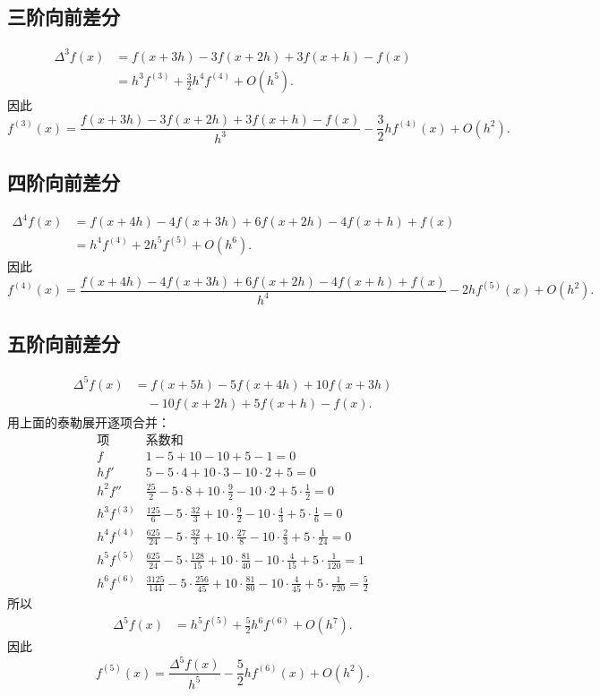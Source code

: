 \documentclass[12pt,a4paper]{ctexart}
\begin{document}
\subsection{三阶向前差分}
\[
\begin{aligned}
\Delta^3 f(x)
&=f(x+3h)-3f(x+2h)+3f(x+h)-f(x)\\
&=h^3f^{(3)}+\frac32h^4f^{(4)}+O(h^5).
\end{aligned}
\]
因此
\[
  \boxed{f^{(3)}(x)=\frac{f(x+3h)-3f(x+2h)+3f(x+h)-f(x)}{h^3}-\frac32h f^{(4)}(x)+O(h^2).}
\]

\subsection{四阶向前差分}
\[
\begin{aligned}
\Delta^4 f(x)
&=f(x+4h)-4f(x+3h)+6f(x+2h)-4f(x+h)+f(x)\\
&=h^4f^{(4)}+2h^5f^{(5)}+O(h^6).
\end{aligned}
\]
因此
\[
  \boxed{f^{(4)}(x)=\frac{f(x+4h)-4f(x+3h)+6f(x+2h)-4f(x+h)+f(x)}{h^4}-2h f^{(5)}(x)+O(h^2).}
\]

\subsection{五阶向前差分}
\[
\begin{aligned}
\Delta^5 f(x)
&=f(x+5h)-5f(x+4h)+10f(x+3h)\\
&\quad -10f(x+2h)+5f(x+h)-f(x).
\end{aligned}
\]
用上面的泰勒展开逐项合并：
\[
\begin{array}{c|c}
\text{项} & \text{系数和}\\
\hline
f & 1-5+10-10+5-1=0\\
hf' & 5-5\cdot4+10\cdot3-10\cdot2+5=0\\
h^2f'' & \frac{25}{2}-5\cdot8+10\cdot\frac92-10\cdot2+5\cdot\frac12=0\\
h^3f^{(3)} & \frac{125}{6}-5\cdot\frac{32}{3}+10\cdot\frac92-10\cdot\frac43+5\cdot\frac16=0\\
h^4f^{(4)} & \frac{625}{24}-5\cdot\frac{32}{3}+10\cdot\frac{27}{8}-10\cdot\frac23+5\cdot\frac1{24}=0\\
h^5f^{(5)} & \frac{625}{24}-5\cdot\frac{128}{15}+10\cdot\frac{81}{40}-10\cdot\frac4{15}+5\cdot\frac1{120}=1\\
h^6f^{(6)} & \frac{3125}{144}-5\cdot\frac{256}{45}+10\cdot\frac{81}{80}-10\cdot\frac4{45}+5\cdot\frac1{720}=\frac52
\end{array}
\]
所以
\[
\begin{aligned}
\Delta^5 f(x)
&=h^5f^{(5)}+\frac52h^6f^{(6)}+O(h^7).
\end{aligned}
\]
因此
\[
  \boxed{f^{(5)}(x)=\frac{\Delta^5 f(x)}{h^5}-\frac52h f^{(6)}(x)+O(h^2).}
\]
\end{document}
